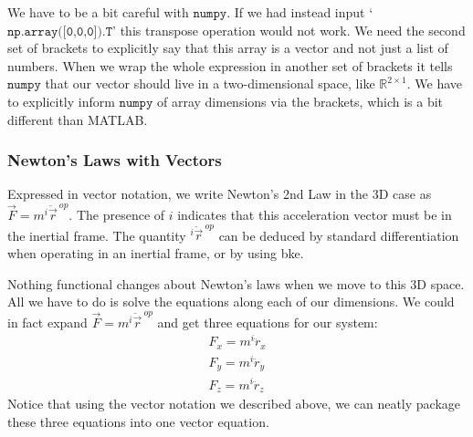 \documentclass[10pt, openany, titlepage]{book}
\theoremstyle{definition}
\begin{document}
We have to be a bit careful with $\texttt{numpy}$. If we had instead input `$\texttt{np.array([0,0,0]).T}$' this transpose operation would not work. We need the second set of brackets to explicitly say that this array is a vector and not just a list of numbers. When we wrap the whole expression in another set of brackets it tells $\texttt{numpy}$ that our vector should live in a two-dimensional space, like $\mathbb{R}^{2\times 1}$. We have to explicitly inform $\texttt{numpy}$ of array dimensions via the brackets, which is a bit different than MATLAB.

\subsubsection{Newton's Laws with Vectors}

Expressed in vector notation, we write Newton's 2nd Law in the 3D case as $\vec{F}=m{}^i\ddot{\vec{r}}^{\ op}$. The presence of $i$ indicates that this acceleration vector must be in the \gls{inertial frame}. The quantity ${}^i\ddot{\vec{r}}^{\ op}$ can be deduced by standard differentiation when operating in an inertial frame, or by using \gls{bke}.

Nothing functional changes about Newton's laws when we move to this 3D space. All we have to do is solve the equations along each of our dimensions. We could in fact expand $\vec{F}=m{}^i\ddot{\vec{r}}^{\ op}$ and get three equations for our system:
\begin{gather}
    F_x=m^i\ddot{r}_x\\
    F_y=m^i\ddot{r}_y\\
    F_z=m^i\ddot{r}_z
\end{gather}
Notice that using the vector notation we described above, we can neatly package these three equations into one vector equation.
\end{document}

